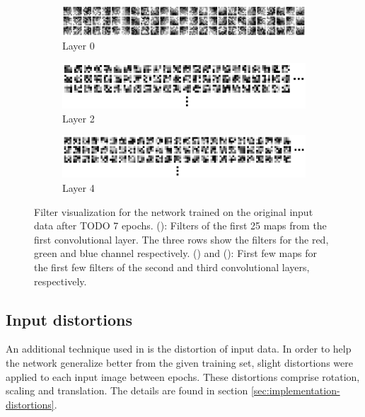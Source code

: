 \documentclass[11pt, a4paper]{article}
\begin{document}
\begin{figure}
	\centering
	\begin{subfigure}{\textwidth}
		\includegraphics[width=1\textwidth]{filter_visualizations/gtsrb_nomorph_filters_0}
		\caption{Layer 0}
		\label{fig:gtsrb-filters-0}
	\end{subfigure}
	\begin{subfigure}{\textwidth}
		\includegraphics[width=1\textwidth]{filter_visualizations/gtsrb_nomorph_filters_2}
		\caption{Layer 2}
		\label{fig:gtsrb-filters-2}
	\end{subfigure}
	\begin{subfigure}{\textwidth}
		\includegraphics[width=1\textwidth]{filter_visualizations/gtsrb_nomorph_filters_4}
		\caption{Layer 4}
		\label{fig:gtsrb-filters-4}
	\end{subfigure}
	\caption{Filter visualization for the network trained on the original input data after TODO 7 epochs. (): Filters of the first 25 maps from the first convolutional layer. The three rows show the filters for the red, green and blue channel respectively. () and (): First few maps for the first few filters of the second and third convolutional layers, respectively.}
	\label{fig:gtsrb-filters}
\end{figure}

\subsection{Input distortions}
An additional technique used in \cite{multi-column-neural-network-gtsrb} is the distortion of input data. In order to help the network generalize better from the given training set, slight distortions were applied to each input image between epochs. These distortions comprise rotation, scaling and translation. The details are found in section \ref{sec:implementation-distortions}.
\end{document}
